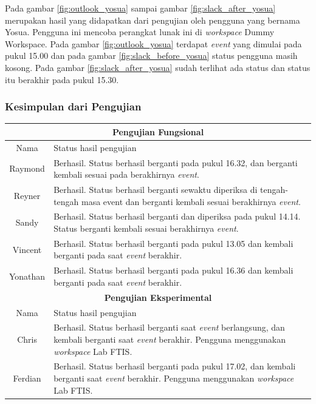 Pada gambar \ref{fig:outlook_yosua} sampai gambar \ref{fig:slack_after_yosua} merupakan hasil yang didapatkan dari pengujian oleh pengguna yang bernama Yosua. Pengguna ini mencoba perangkat lunak ini di \textit{workspace} Dummy Workspace. Pada gambar \ref{fig:outlook_yosua} terdapat \textit{event} yang dimulai pada pukul 15.00 dan pada gambar \ref{fig:slack_before_yosua} status pengguna masih kosong. Pada gambar \ref{fig:slack_after_yosua} sudah terlihat ada status dan status itu berakhir pada pukul 15.30. 
\clearpage

\subsubsection{Kesimpulan dari Pengujian}

\begin{center}
\begin{tabular}{ |c|p{9cm}| }
\toprule
 \multicolumn{2}{|c|}{\textbf{Pengujian Fungsional}} \\ 
 \hline
 Nama & Status hasil pengujian  \\
 \hline
 Raymond & Berhasil. Status berhasil berganti pada pukul 16.32, dan berganti kembali sesuai pada berakhirnya \textit{event}. \\  
 Reyner & Berhasil. Status berhasil berganti sewaktu diperiksa di tengah-tengah masa event dan berganti kembali sesuai berakhirnya \textit{event}. \\  \hline
 Sandy & Berhasil. Status berhasil berganti dan diperiksa pada pukul 14.14. Status berganti kembali sesuai berakhirnya \textit{event}. \\ \hline 
 Vincent & Berhasil. Status berhasil berganti pada pukul 13.05 dan kembali berganti pada saat \textit{event} berakhir. \\  \hline
 Yonathan & Berhasil. Status berhasil berganti pada pukul 16.36 dan kembali berganti pada saat \textit{event} berakhir. \\ \hline
 \multicolumn{2}{|c|}{\textbf{Pengujian Eksperimental}} \\ 
 \hline
 Nama & Status hasil pengujian  \\  
 \hline
 Chris & Berhasil. Status berhasil berganti saat \textit{event} berlangsung, dan kembali berganti saat \textit{event} berakhir. Pengguna menggunakan \textit{workspace} Lab FTIS. \\  \hline
 Ferdian & Berhasil. Status berhasil berganti pada pukul 17.02, dan kembali berganti saat \textit{event} berakhir. Pengguna menggunakan \textit{workspace} Lab FTIS. \\  \hline

\end{tabular}
\end{center}
